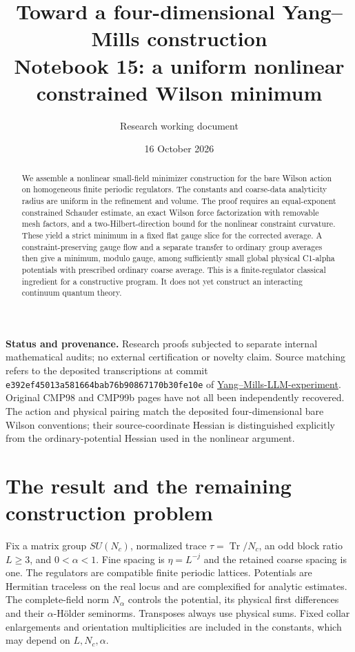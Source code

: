 \documentclass[11pt]{article}
\title{Toward a four-dimensional Yang--Mills construction\\
\large Notebook 15: a uniform nonlinear constrained Wilson minimum}
\author{Research working document}
\date{16 October 2026}
\theoremstyle{remark}
\begin{document}
\maketitle
\begin{abstract}
We assemble a nonlinear small-field minimizer construction for the
bare Wilson action on homogeneous finite periodic regulators.
The constants and coarse-data analyticity radius are uniform in
the refinement and volume. The proof requires an equal-exponent
constrained Schauder estimate, an exact Wilson force factorization
with removable mesh factors, and a two-Hilbert-direction bound
for the nonlinear constraint curvature. These yield a strict
minimum in a fixed flat gauge slice for the corrected average.
A constraint-preserving gauge flow and a separate transfer to
ordinary group averages then give a minimum, modulo gauge,
among sufficiently small global physical C1-alpha potentials
with prescribed ordinary coarse average. This is a finite-regulator
classical ingredient for a constructive program. It does not yet
construct an interacting continuum quantum theory.
\end{abstract}

\noindent\textbf{Status and provenance.}
Research proofs subjected to separate internal mathematical audits;
no external certification or novelty claim. Source matching refers
to the deposited transcriptions at commit
\texttt{e392ef4501\allowbreak 3a581664ba\allowbreak b76b908671\allowbreak 70b30fe10e} of
\href{https://github.com/ethanwsussman/Yang--Mills-LLM-experiment/tree/e392ef45013a581664bab76b90867170b30fe10e}{Yang--Mills-LLM-experiment}.
Original CMP98 and CMP99b pages have not all been independently
recovered. The action and physical pairing match the deposited
four-dimensional bare Wilson conventions; their source-coordinate
Hessian is distinguished explicitly from the ordinary-potential
Hessian used in the nonlinear argument.

\section{The result and the remaining construction problem}
\label{nm15-overview}

Fix a matrix group $SU(N_c)$, normalized trace
$\tau=\operatorname{Tr}/N_c$, an odd block ratio $L\ge3$,
and $0<\alpha<1$. Fine spacing is $\eta=L^{-j}$ and the
retained coarse spacing is one. The regulators are compatible
finite periodic lattices. Potentials are Hermitian traceless
on the real locus and are complexified for analytic estimates.
The complete-field norm $N_\alpha$ controls the potential,
its physical first differences and their $\alpha$-H\"older
seminorms. Transposes always use physical sums. Fixed collar
enlargements and orientation multiplicities are included in
the constants, which may depend on $L,N_c,\alpha$.
\end{document}
